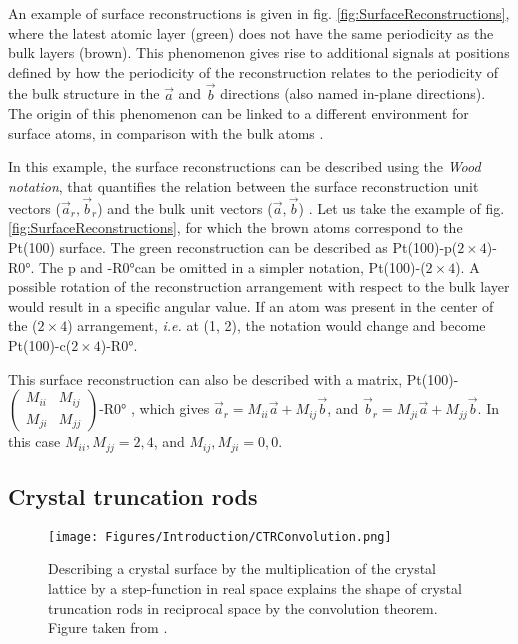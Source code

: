An example of surface reconstructions is given in fig. \ref{fig:SurfaceReconstructions}, where the latest atomic layer (green) does not have the same periodicity as the bulk layers (brown).
This phenomenon gives rise to additional signals at positions defined by how the periodicity of the reconstruction relates to the periodicity of the bulk structure in the $\vec{a}$ and $\vec{b}$ directions (also named in-plane directions).
The origin of this phenomenon can be linked to a different environment for surface atoms, in comparison with the bulk atoms \parencite{Robinson1983, Feidenhansl1989}.

In this example, the surface reconstructions can be described using the \textit{Wood notation}, that quantifies the relation between the surface reconstruction unit vectors ($\vec{a}_r, \vec{b}_r$) and the bulk unit vectors ($\vec{a}, \vec{b}$) \parencite{Wood1964, Unertl1996, Goncharova2018}.
Let us take the example of fig. \ref{fig:SurfaceReconstructions}, for which the brown atoms correspond to the Pt(100) surface.
The green reconstruction can be described as Pt(100)-p($2\times4$)-R\ang{0}.
The p and -R\ang{0}can be omitted in a simpler notation, Pt(100)-($2\times4$).
A possible rotation of the reconstruction arrangement with respect to the bulk layer would result in a specific angular value.
If an atom was present in the center of the ($2\times4$) arrangement, \textit{i.e.} at (1, 2), the notation would change and become Pt(100)-c($2\times4$)-R\ang{0}.

This surface reconstruction can also be described with a matrix, Pt(100)-
$\begin{pmatrix}
  M_{ii} & M_{ij}\\
  M_{ji} & M_{jj}
\end{pmatrix}$-R\ang{0}
, which gives $\vec{a}_r = M_{ii} \vec{a} + M_{ij} \vec{b}$, and  $\vec{b}_r = M_{ji} \vec{a} + M_{jj} \vec{b}$.
In this case $M_{ii}, M_{jj} = 2, 4$, and $M_{ij}, M_{ji} = 0, 0$.

\subsection{Crystal truncation rods} \label{sec:CTR}

\begin{figure}[!htb]
    \centering
    \texttt{[image: Figures/Introduction/CTRConvolution.png]}
    \caption{
    Describing a crystal surface by the multiplication of the crystal lattice by a step-function in real space explains the shape of crystal truncation rods in reciprocal space by the convolution theorem.
    Figure taken from \cite{Willmott}.
    }
    \label{fig:CTRConvolution}
\end{figure}

